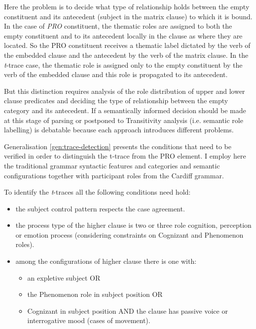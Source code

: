     Here the problem is to decide what type of relationship holds between the empty constituent and its antecedent (subject in the matrix clause) to which it is bound. In the case of \textit{PRO} constituent, the thematic roles are assigned to both the empty constituent and to its antecedent locally in the clause as where they are located. So the PRO constituent receives a thematic label dictated by the verb of the embedded clause and the antecedent by the verb of the matrix clause. In the \textit{t}-trace case, the thematic role is assigned only to the empty constituent by the verb of the embedded clause and this role is propagated to its antecedent. 

    But this distinction requires analysis of the role distribution of upper and lower clause predicates and deciding the type of relationship between the empty category and its antecedent. 
    If a semantically informed decision should be made at this stage of parsing or postponed to Transitivity analysis (i.e. semantic role labelling) is debatable because each approach introduces different problems. 

    Generalisation \ref{gen:trace-detection} presents the conditions that need to be verified in order to distinguish the t-trace from the PRO element. I employ here the traditional grammar syntactic features and categories and semantic configurations together with participant roles from the Cardiff grammar. 

    \begin{generalization}\label{gen:trace-detection}
        To identify the \textit{t}-traces all the following conditions need hold:
        \begin{itemize}
            \item the subject control pattern respects the case agreement.
            \item the process type of the higher clause is two or three role cognition, perception or emotion process (considering constraints on Cognizant and Phenomenon roles). 
            \item among the configurations of higher clause there is one with:
            \begin{itemize}
                \item an expletive subject OR
                \item the Phenomenon role in subject position OR
                \item Cognizant in subject position AND the clause has passive voice or interrogative mood (cases of movement).
            \end{itemize}
        \end{itemize}
    \end{generalization}


